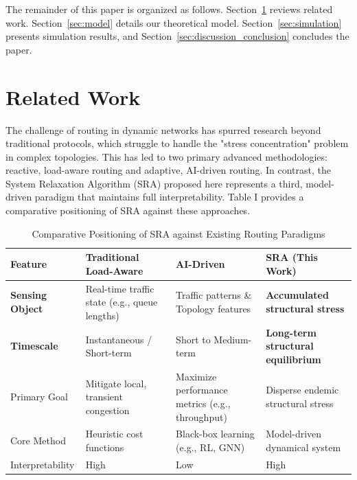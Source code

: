\documentclass[journal]{IEEEtran}
\begin{document}
The remainder of this paper is organized as follows. Section~\ref{sec:related_work} reviews related work. Section~\ref{sec:model} details our theoretical model. Section~\ref{sec:simulation} presents simulation results, and Section~\ref{sec:discussion_conclusion} concludes the paper.


\section{Related Work}
\label{sec:related_work}

The challenge of routing in dynamic networks has spurred research beyond traditional protocols, which struggle to handle the "stress concentration" problem in complex topologies. This has led to two primary advanced methodologies: reactive, load-aware routing and adaptive, AI-driven routing. In contrast, the System Relaxation Algorithm (SRA) proposed here represents a third, model-driven paradigm that maintains full interpretability. Table I provides a comparative positioning of SRA against these approaches.

\begin{table}[h]
\centering
\caption{Comparative Positioning of SRA against Existing Routing Paradigms}
\label{tab:related_work_comparison}
\renewcommand{\arraystretch}{1.2}
\small
\begin{tabularx}{\columnwidth}{|l|X|X|X|}
\hline
\textbf{Feature} & \textbf{Traditional Load-Aware} & \textbf{AI-Driven} & \textbf{SRA (This Work)} \\
\hline \hline
\textbf{Sensing Object} & Real-time traffic state (e.g., queue lengths) & Traffic patterns \& Topology features & \textbf{Accumulated structural stress} \\
\hline
\textbf{Timescale} & Instantaneous / Short-term & Short to Medium-term & \textbf{Long-term structural equilibrium} \\
\hline
Primary Goal & Mitigate local, transient congestion & Maximize performance metrics (e.g., throughput) & Disperse endemic structural stress \\
\hline
Core Method & Heuristic cost functions & Black-box learning (e.g., RL, GNN) & Model-driven dynamical system \\
\hline
Interpretability & High & Low & High \\
\hline
\end{tabularx}
\end{table}
\end{document}
